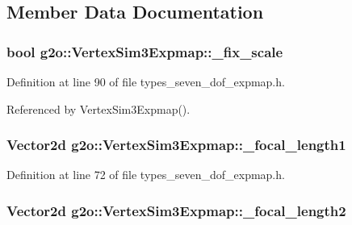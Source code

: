 \subsection{Member Data Documentation}
\subsubsection[{\texorpdfstring{\+\_\+fix\+\_\+scale}{_fix_scale}}]{\setlength{\rightskip}{0pt plus 5cm}bool g2o\+::\+Vertex\+Sim3\+Expmap\+::\+\_\+fix\+\_\+scale}\hypertarget{classg2o_1_1VertexSim3Expmap_a63854235b605e45825798d327890930e}{}\label{classg2o_1_1VertexSim3Expmap_a63854235b605e45825798d327890930e}


Definition at line 90 of file types\+\_\+seven\+\_\+dof\+\_\+expmap.\+h.



Referenced by Vertex\+Sim3\+Expmap().

\subsubsection[{\texorpdfstring{\+\_\+focal\+\_\+length1}{_focal_length1}}]{\setlength{\rightskip}{0pt plus 5cm}Vector2d g2o\+::\+Vertex\+Sim3\+Expmap\+::\+\_\+focal\+\_\+length1}\hypertarget{classg2o_1_1VertexSim3Expmap_a05a79614b17cc700acaeb86039c2e181}{}\label{classg2o_1_1VertexSim3Expmap_a05a79614b17cc700acaeb86039c2e181}


Definition at line 72 of file types\+\_\+seven\+\_\+dof\+\_\+expmap.\+h.

\subsubsection[{\texorpdfstring{\+\_\+focal\+\_\+length2}{_focal_length2}}]{\setlength{\rightskip}{0pt plus 5cm}Vector2d g2o\+::\+Vertex\+Sim3\+Expmap\+::\+\_\+focal\+\_\+length2}\hypertarget{classg2o_1_1VertexSim3Expmap_a05c121f708922185d7b0823251c28290}{}\label{classg2o_1_1VertexSim3Expmap_a05c121f708922185d7b0823251c28290}


